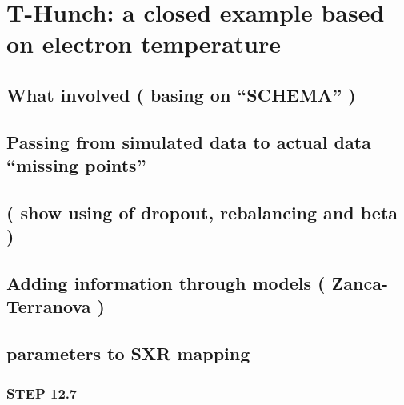 \chapter{T-Hunch: a closed example based on electron temperature}

\section{What involved ( basing on “SCHEMA” )} %
\section{Passing from simulated data to actual data  “missing points”  }


\section{( show using of dropout, rebalancing and beta )}


\section{Adding information through models ( Zanca-Terranova )}


\section{parameters to SXR mapping}

\subsection{STEP 12.7}

